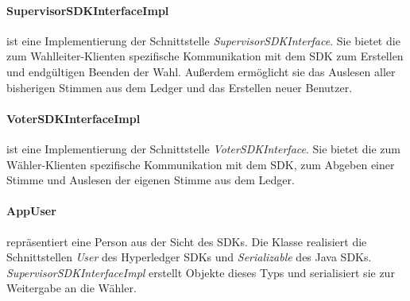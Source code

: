 \documentclass[parskip=full]{scrartcl}
\begin{document}
	\paragraph{SupervisorSDKInterfaceImpl} ist eine Implementierung der Schnittstelle \textit{SupervisorSDKInterface}. Sie bietet die zum Wahlleiter-Klienten spezifische Kommunikation mit dem SDK zum Erstellen und endgültigen Beenden der Wahl. Außerdem ermöglicht sie das Auslesen aller bisherigen Stimmen aus dem Ledger und das Erstellen neuer Benutzer.
	\paragraph{VoterSDKInterfaceImpl} ist eine Implementierung der Schnittstelle \textit{VoterSDKInterface}. Sie bietet die zum Wähler-Klienten spezifische Kommunikation mit dem SDK, zum Abgeben einer Stimme und Auslesen der eigenen Stimme aus dem Ledger.
	\paragraph{AppUser} repräsentiert eine Person aus der Sicht des SDKs. Die Klasse realisiert die Schnittstellen \textit{User} des Hyperledger SDKs und \textit{Serializable} des Java SDKs. \textit{SupervisorSDKInterfaceImpl} erstellt Objekte dieses Typs und serialisiert sie zur Weitergabe an die Wähler.
\end{document}
